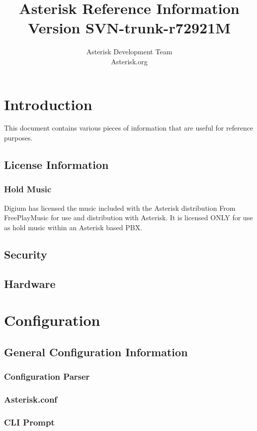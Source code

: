 \documentclass[12pt,a4]{report}
\author{Asterisk Development Team \\ Asterisk.org}
\title{Asterisk Reference Information \\ Version SVN-trunk-r72921M}
\begin{document}
\maketitle

\tableofcontents

\chapter{Introduction}

This document contains various pieces of information that are useful for
reference purposes.

  \section{License Information}
  
     \subsection{Hold Music}
       Digium has licensed the music included with
       the Asterisk distribution From FreePlayMusic
       for use and distribution with Asterisk.  It
       is licensed ONLY for use as hold music within
       an Asterisk based PBX.
  \section{Security}
  
  \section{Hardware}
  

\chapter{Configuration}
  \section{General Configuration Information}
    \subsection{Configuration Parser}
    
    \subsection{Asterisk.conf}
    
    \subsection{CLI Prompt}
    
\end{document}
